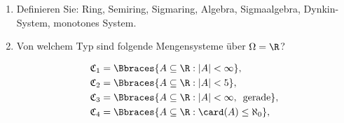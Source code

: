 
\begin{exercise}

\phantom{}

\begin{enumerate}[label = (\alph*)]

  \item
  Definieren Sie: Ring, Semiring, Sigmaring, Algebra, Sigmaalgebra, Dynkin-System, monotones System.
  
  \item
  Von welchem Typ sind folgende Mengensysteme über $\Omega = \R$?
  
  \begin{align*}
    \mathfrak{C}_1 & = \Bbraces{A \subseteq \R: |A| < \infty}, \\
    \mathfrak{C}_2 & = \Bbraces{A \subseteq \R: |A| < 5}, \\
    \mathfrak{C}_3 & = \Bbraces{A \subseteq \R: |A| < \infty, \enspace \text{gerade}}, \\
    \mathfrak{C}_4 & = \Bbraces{A \subseteq \R: \card(A) \leq \aleph_0}, \\
  \end{align*}

\end{enumerate}

\end{exercise}

